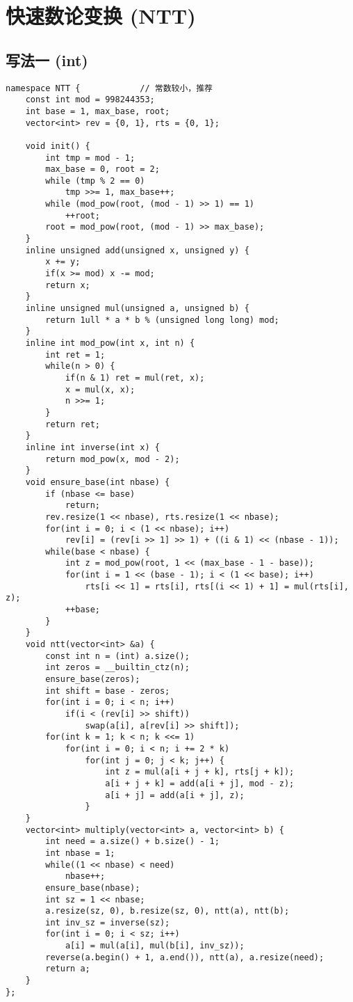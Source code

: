 \section{快速数论变换 (NTT)}
\subsection{写法一 (int)}
\begin{verbatim}
namespace NTT {            // 常数较小，推荐
    const int mod = 998244353;
    int base = 1, max_base, root;
    vector<int> rev = {0, 1}, rts = {0, 1};

    void init() {
        int tmp = mod - 1;
        max_base = 0, root = 2;
        while (tmp % 2 == 0)
            tmp >>= 1, max_base++;
        while (mod_pow(root, (mod - 1) >> 1) == 1) 
            ++root;
        root = mod_pow(root, (mod - 1) >> max_base);
    } 
    inline unsigned add(unsigned x, unsigned y) {
        x += y;
        if(x >= mod) x -= mod;
        return x;
    }
    inline unsigned mul(unsigned a, unsigned b) {
        return 1ull * a * b % (unsigned long long) mod;
    }
    inline int mod_pow(int x, int n) {
        int ret = 1;
        while(n > 0) {
            if(n & 1) ret = mul(ret, x);
            x = mul(x, x);
            n >>= 1;
        }
        return ret;
    }
    inline int inverse(int x) {
        return mod_pow(x, mod - 2);
    }
    void ensure_base(int nbase) {
        if (nbase <= base)
            return;
        rev.resize(1 << nbase), rts.resize(1 << nbase);
        for(int i = 0; i < (1 << nbase); i++)
            rev[i] = (rev[i >> 1] >> 1) + ((i & 1) << (nbase - 1));
        while(base < nbase) {
            int z = mod_pow(root, 1 << (max_base - 1 - base));
            for(int i = 1 << (base - 1); i < (1 << base); i++)
                rts[i << 1] = rts[i], rts[(i << 1) + 1] = mul(rts[i], z);
            ++base;
        }
    }
    void ntt(vector<int> &a) {
        const int n = (int) a.size();
        int zeros = __builtin_ctz(n);
        ensure_base(zeros);
        int shift = base - zeros;
        for(int i = 0; i < n; i++)
            if(i < (rev[i] >> shift))
                swap(a[i], a[rev[i] >> shift]);
        for(int k = 1; k < n; k <<= 1)
            for(int i = 0; i < n; i += 2 * k)
                for(int j = 0; j < k; j++) {
                    int z = mul(a[i + j + k], rts[j + k]);
                    a[i + j + k] = add(a[i + j], mod - z);
                    a[i + j] = add(a[i + j], z);
                }
    }
    vector<int> multiply(vector<int> a, vector<int> b) {
        int need = a.size() + b.size() - 1;
        int nbase = 1;
        while((1 << nbase) < need)
            nbase++;
        ensure_base(nbase);
        int sz = 1 << nbase;
        a.resize(sz, 0), b.resize(sz, 0), ntt(a), ntt(b);
        int inv_sz = inverse(sz);
        for(int i = 0; i < sz; i++)
            a[i] = mul(a[i], mul(b[i], inv_sz));
        reverse(a.begin() + 1, a.end()), ntt(a), a.resize(need);
        return a;
    }
};
\end{verbatim}

